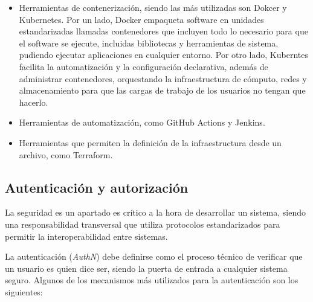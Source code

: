 \begin{itemize}
    \item Herramientas de contenerización, siendo las más utilizadas son Dokcer y Kubernetes. Por un lado, Docker 
    \cite{docker} empaqueta software en unidades estandarizadas llamadas contenedores que incluyen todo lo necesario 
    para que el software se ejecute, incluidas bibliotecas y herramientas de sistema, pudiendo ejecutar aplicaciones 
    en cualquier entorno. Por otro lado, Kuberntes \cite{kubernetes} facilita la automatización y la configuración 
    declarativa, además de administrar contenedores, orquestando la infraestructura de cómputo, redes y almacenamiento 
    para que las cargas de trabajo de los usuarios no tengan que hacerlo.
    \item Herramientas de automatización, como GitHub Actions y Jenkins.
    \item Herramientas que permiten la definición de la infraestructura desde un archivo, como Terraform.
\end{itemize}

\subsection{Autenticación y autorización}

La seguridad es un apartado es crítico a la hora de desarrollar un sistema, siendo una responsabilidad transversal que 
utiliza protocolos estandarizados para permitir la interoperabilidad entre sistemas.

La autenticación (\textit{AuthN}) debe definirse como el proceso técnico de verificar que un usuario es quien dice ser, 
siendo la puerta de entrada a cualquier sistema seguro. Algunos de los mecanismos más utilizados para la autenticación 
son los siguientes:

